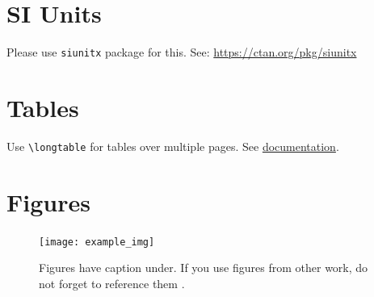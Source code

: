 \section{SI Units}
Please use \texttt{siunitx} package for this. See:  \url{https://ctan.org/pkg/siunitx}

\section{Tables}
\begin{table}[H]
\caption{Tables have caption on top.}
\label{tab:table_caption}
\centering
{}
\end{table}

Use \texttt{\textbackslash longtable} for tables over multiple pages. See \href{https://de.wikibooks.org/wiki/LaTeX-W%C3%B6rterbuch:_longtable_(Umgebung)}{documentation}.

\section{Figures}
\begin{figure}[H]
    \centering
    \texttt{[image: example\_img]}
    \caption{Figures have caption under. If you use figures from other work, do not forget to reference them \cite{deininger2005studien}.}
    \label{fig:figure_caption}
\end{figure}

